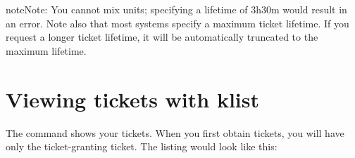 \documentclass[letterpaper,10pt,english]{sphinxmanual}
\begin{document}
%
\begin{sphinxVerbatim}[commandchars=\\\{\}]
     
    \PYG{p}{[} \PYG{l+s+s1}{s password here.]}
\end{sphinxVerbatim}

\begin{sphinxadmonition}{note}{Note:}
You cannot mix units; specifying a lifetime of 3h30m would
result in an error.  Note also that most systems specify a
maximum ticket lifetime.  If you request a longer ticket
lifetime, it will be automatically truncated to the maximum
lifetime.
\end{sphinxadmonition}


\section{Viewing tickets with klist}
\label{\detokenize{user/tkt_mgmt:viewing-tickets-with-klist}}\label{\detokenize{user/tkt_mgmt:view-tkt}}
The {\hyperref[\detokenize{user/user_commands/klist:klist-1}]{}} command shows your tickets.  When you first obtain
tickets, you will have only the ticket-granting ticket.  The listing
would look like this:

%
\begin{sphinxVerbatim}[commandchars=\\\{\}]
 
  
  

                   
      
\end{sphinxVerbatim}
\end{document}
